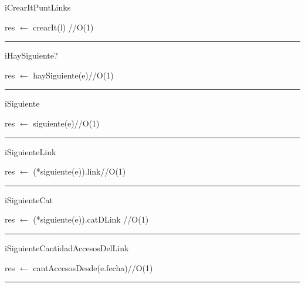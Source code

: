 \begin{algorithm}[H]
\caption{iCrearItPuntLinks}
\begin{algorithmic}[1]
\State res $\gets$ crearIt(l) \hfill //O(1)
\EndFunction 
\end{algorithmic}
\hrule
{}
\end{algorithm}

\begin{algorithm}[H]
\caption{iHaySiguiente?}
\begin{algorithmic}[1]
\state res $\gets$ haySiguiente(e)\hfill //O(1)
\EndFunction 
\end{algorithmic}
\hrule
{}
\end{algorithm}

\begin{algorithm}[H]
\caption{iSiguiente}
\begin{algorithmic}[1]
\state res $\gets$ siguiente(e)\hfill //O(1)
\EndFunction 
\end{algorithmic}
\hrule
{}
\end{algorithm}

\begin{algorithm}[H]
\caption{iSiguienteLink}
\begin{algorithmic}[1]
\state res $\gets$ (*siguiente(e)).link\hfill //O(1)
\EndFunction 
\end{algorithmic}
\hrule
{}
\end{algorithm}


\begin{algorithm}[H]
\caption{iSiguienteCat}
\begin{algorithmic}[1]
\state res $\gets$ (*siguiente(e)).catDLink \hfill //O(1)
\EndFunction 
\end{algorithmic}
\hrule
{}
\end{algorithm}

\begin{algorithm}[H]
\caption{iSiguienteCantidadAccesosDelLink}
\begin{algorithmic}[1]
\state res $\gets$ cantAccesosDesde(e.fecha)\hfill //O(1)
\EndFunction 
\end{algorithmic}
\hrule
{}
\end{algorithm}


